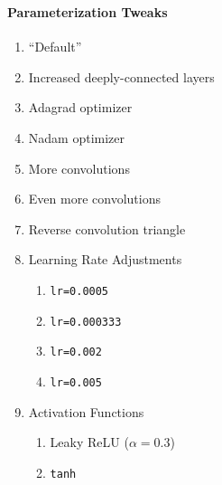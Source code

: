 \begin{frame}
	\frametitle{\secttitle}
	\framesubtitle{Parameterization Tweaks}
	\begin{enumerate}
		\item ``Default''
		\item Increased deeply-connected layers
		\item Adagrad optimizer
		\item Nadam optimizer
		\item More convolutions
		\item Even more convolutions
		\item Reverse convolution triangle
		\item Learning Rate Adjustments
			\begin{enumerate}
				\item \texttt{lr=0.0005}
				\item \texttt{lr=0.000333}
				\item \texttt{lr=0.002}
				\item \texttt{lr=0.005}
			\end{enumerate}
		\item Activation Functions
			\begin{enumerate}
				\item Leaky ReLU ($\alpha = 0.3$)
				\item \texttt{tanh}
			\end{enumerate}
	\end{enumerate}
\end{frame}
